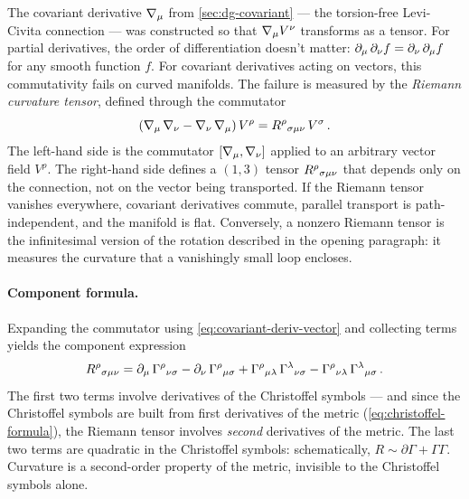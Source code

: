 The covariant derivative $\nabla_{\mu}$ from \cref{sec:dg-covariant} --- the
torsion-free Levi-Civita connection --- was constructed so that
$\nabla_{\mu} V^\nu$ transforms as a tensor.  For partial
derivatives, the order of differentiation doesn't matter:
$\partial_{\mu}\,\partial_{\nu} f = \partial_{\nu}\,\partial_{\mu} f$ for any smooth function $f$.
For covariant derivatives acting on vectors, this commutativity fails on curved
manifolds.  The failure is measured by the \emph{Riemann curvature tensor},
defined through the commutator
%
\begin{equation}
  (\nabla_{\mu}\,\nabla_{\nu} - \nabla_{\nu}\,\nabla_{\mu})\, V^\rho
  = R^{\rho}{}_{\sigma \mu \nu}\, V^\sigma \,.
  \label{eq:riemann-def}
\end{equation}
%
The left-hand side is the commutator $[\nabla_{\mu}, \nabla_{\nu}]$ applied to an
arbitrary vector field $V^\rho$.  The right-hand side defines a $(1,3)$
tensor $R^{\rho}{}_{\sigma \mu \nu}$ that depends only on the connection,
not on the vector being transported.  If the Riemann tensor vanishes
everywhere, covariant derivatives commute, parallel transport is
path-independent, and the manifold is flat.  Conversely, a nonzero Riemann
tensor is the infinitesimal version of the rotation described in the opening
paragraph: it measures the curvature that a vanishingly small loop encloses.

\paragraph{Component formula.}

Expanding the commutator using \cref{eq:covariant-deriv-vector} and collecting
terms yields the component expression
%
\begin{equation}
  R^{\rho}{}_{\sigma \mu \nu}
  = \partial_{\mu}\,\Gamma^{\rho}{}_{\nu \sigma}
  - \partial_{\nu}\,\Gamma^{\rho}{}_{\mu \sigma}
  + \Gamma^{\rho}{}_{\mu \lambda}\,\Gamma^{\lambda}{}_{\nu \sigma}
  - \Gamma^{\rho}{}_{\nu \lambda}\,\Gamma^{\lambda}{}_{\mu \sigma} \,.
  \label{eq:riemann-components}
\end{equation}
%
The first two terms involve derivatives of the Christoffel symbols --- and
since the Christoffel symbols are built from first derivatives of the metric
(\cref{eq:christoffel-formula}), the Riemann tensor involves \emph{second}
derivatives of the metric.  The last two terms are quadratic in the Christoffel
symbols: schematically, $R \sim \partial\Gamma + \Gamma\Gamma$.  Curvature is
a second-order property of the metric, invisible to the Christoffel symbols
alone.


